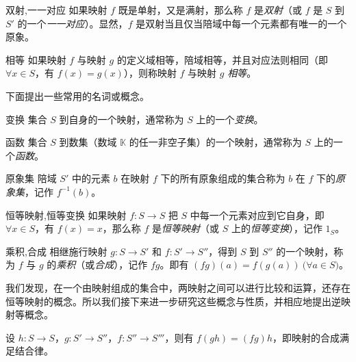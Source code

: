 \begin{definition}{双射,一一对应}
	如果映射 $f$ 既是单射，又是满射，那么称 $f$ 是\emph{双射}（或 $f$ 是 $S$ 到 $S'$ 的一个\emph{一一对应}）。显然，$f$ 是双射当且仅当陪域中每一个元素都有唯一的一个原象。
\end{definition}

\begin{definition}{相等}
	 如果映射 $f$ 与映射 $g$ 的定义域相等，陪域相等，并且对应法则相同（即 $\forall x \in S$，有 $f(x) = g(x)$），则称映射 $f$ 与映射 $g$ \emph{相等}。
\end{definition}

下面提出一些常用的名词或概念。

\begin{definition}{变换}
	集合 $S$ 到自身的一个映射，通常称为 $S$ 上的一个\emph{变换}。
\end{definition}

\begin{definition}{函数}
	集合 $S$ 到数集（数域 $\mathbb K$ 的任一非空子集）的一个映射，通常称为 $S$ 上的一个\emph{函数}。
\end{definition}

\begin{definition}{原象集}
	陪域 $S'$ 中的元素 $b$ 在映射 $f$ 下的所有原象组成的集合称为 $b$ 在 $f$ 下的\emph{原象集}，记作 $f^{-1}(b)$。
\end{definition}

\begin{definition}{恒等映射,恒等变换}
	如果映射 $f \colon S \to S$ 把 $S$ 中每一个元素对应到它自身，即 $\forall x \in S$，有 $f(x) = x$，那么称 $f$ 是\emph{恒等映射}（或 $S$ 上的\emph{恒等变换}），记作 $1_S$。
\end{definition}

\begin{definition}{乘积,合成}
	相继施行映射 $g: S \to S'$ 和 $f \colon S' \to S''$，得到 $S$ 到 $S''$ 的一个映射，称为 $f$ 与 $g$ 的\emph{乘积}（或\emph{合成}），记作 $fg$。即有 $(fg)(a) = f(g(a)) \pod{\forall a \in S}$。
\end{definition}

我们发现，在一个由映射组成的集合中，两映射之间可以进行比较和运算，还存在恒等映射的概念。所以我们接下来进一步研究这些概念与性质，并相应地提出逆映射等概念。

\begin{theorem}
	设 $h \colon S \to S$，$g \colon S' \to S''$，$f \colon S'' \to S'''$，则有 $f(gh) = (fg)h$，即映射的合成满足结合律。
\end{theorem}


